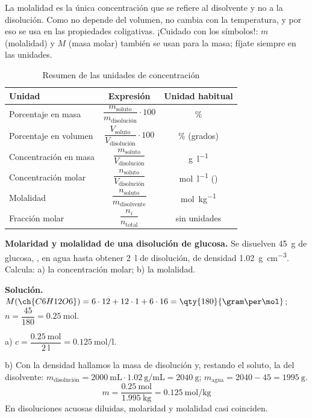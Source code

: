 \begin{remark}
    La molalidad es la única concentración que se refiere al disolvente y no a la disolución. Como no depende del volumen, no cambia
    con la temperatura, y por eso se usa en las propiedades coligativas. ¡Cuidado con los símbolos!: \(m\) (molalidad) y
    \(M\) (masa molar) también se usan para la masa; fíjate siempre en las unidades.
\end{remark}

\begin{table}[H]
    \centering
    \caption{Resumen de las unidades de concentración}
    \vspace{-5pt}
    \begin{tabular}{@{}lcc@{}}
        \toprule
        \textbf{Unidad} & \textbf{Expresión} & \textbf{Unidad habitual} \\
        \midrule
        Porcentaje en masa & \(\dfrac{m_{\text{soluto}}}{m_{\text{disolución}}} \cdot 100\) & \% \\[9pt]
        Porcentaje en volumen & \(\dfrac{V_{\text{soluto}}}{V_{\text{disolución}}} \cdot 100\) & \% (grados) \\[9pt]
        Concentración en masa & \(\dfrac{m_{\text{soluto}}}{V_{\text{disolución}}}\) & \unit{\gram\per\litre} \\[9pt]
        Concentración molar & \(\dfrac{n_{\text{soluto}}}{V_{\text{disolución}}}\) & \unit{\mol\per\litre} (\unit{\M}) \\[9pt]
        Molalidad & \(\dfrac{n_{\text{soluto}}}{m_{\text{disolvente}}}\) & \unit{\mol\per\kilo\gram} \\[9pt]
        Fracción molar & \(\dfrac{n_i}{n_{\text{total}}}\) & sin unidades \\
        \bottomrule
    \end{tabular}
    \label{tab:ud2-unidades}
\end{table}

\begin{example}
    \textbf{Molaridad y molalidad de una disolución de glucosa.} Se disuelven \qty{45}{\gram} de glucosa, , en agua
    hasta obtener \qty{2}{\litre} de disolución, de densidad \qty{1.02}{\gram\per\cubic\cm}. Calcula: a) la concentración molar;
    b) la molalidad.

    \textbf{Solución.} \(M(\ch{C6H12O6}) = 6 \cdot 12 + 12 \cdot 1 + 6 \cdot 16 = \qty{180}{\gram\per\mol}\);
    \(n = \dfrac{45}{180} = \qty{0.25}{\mol}\).

    a) \(c = \dfrac{\qty{0.25}{\mol}}{\qty{2}{\litre}} = \qty{0.125}{\mol\per\litre}\).

    b) Con la densidad hallamos la masa de disolución y, restando el soluto, la del disolvente:
    \(m_{\text{disolución}} = \qty{2000}{\mL} \cdot \qty{1.02}{\gram\per\mL} = \qty{2040}{\gram}\);
    \(m_{\text{agua}} = 2040 - 45 = \qty{1995}{\gram}\).
    \[ m = \frac{\qty{0.25}{\mol}}{\qty{1.995}{\kilo\gram}} = \qty{0.125}{\mol\per\kilo\gram} \]
    En disoluciones acuosas diluidas, molaridad y molalidad casi coinciden.
\end{example}

